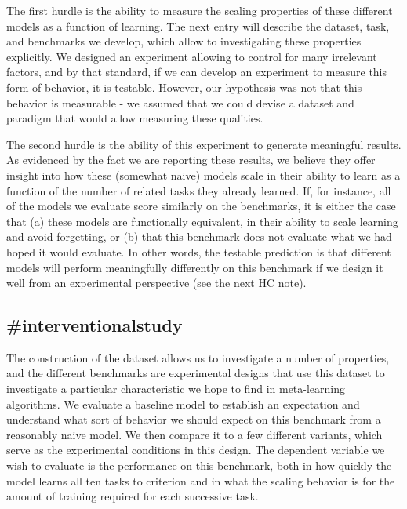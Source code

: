 The first hurdle is the ability to measure the scaling properties of these different models as a function of learning. The next entry will describe the dataset, task, and benchmarks we develop, which allow to investigating these properties explicitly. We designed an experiment allowing to control for many irrelevant factors, and by that standard, if we can develop an experiment to measure this form of behavior, it is testable. However, our hypothesis was not that this behavior is measurable - we assumed that we could devise a dataset and paradigm that would allow measuring these qualities. 

The second hurdle is the ability of this experiment to generate meaningful results. As evidenced by the fact we are reporting these results, we believe they offer insight into how these (somewhat naive) models scale in their ability to learn as a function of the number of related tasks they already learned. If, for instance, all of the models we evaluate score similarly on the benchmarks, it is either the case that (a) these models are functionally equivalent, in their ability to scale learning and avoid forgetting, or (b) that this benchmark does not evaluate what we had hoped it would evaluate. In other words, the testable prediction is that different models will perform meaningfully differently on this benchmark if we design it well from an experimental perspective (see the next HC note). 

\subsection{\#interventionalstudy}
The construction of the dataset allows us to investigate a number of properties, and the different benchmarks are experimental designs that use this dataset to investigate a particular characteristic we hope to find in meta-learning algorithms. We evaluate a baseline model to establish an expectation and understand what sort of behavior we should expect on this benchmark from a reasonably naive model. We then compare it to a few different variants, which serve as the experimental conditions in this design. The dependent variable we wish to evaluate is the performance on this benchmark, both in how quickly the model learns all ten tasks to criterion and in what the scaling behavior is for the amount of training required for each successive task.

